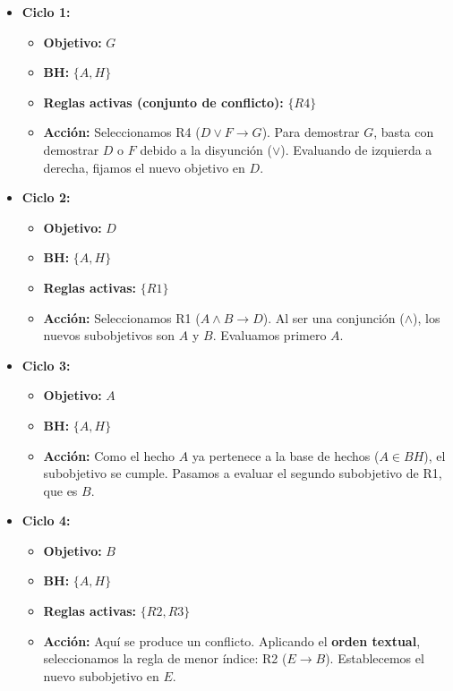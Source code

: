 \documentclass[11pt, a4paper]{article}
\newenvironment{problem}[1][Cuestión]{
	\vspace{0.5cm}
	\noindent{\Large\bfseries #1} \par\vspace{0.5cm}
}{
	\vspace{0.5cm}
}
\begin{document}
\begin{problem}[Cuestión 3 (30 \%)]
{			\begin{itemize}
				\item \textbf{Ciclo 1:}
					\begin{itemize}
						\item \textbf{Objetivo:} $G$
						\item \textbf{BH:} $\{A, H\}$
						\item \textbf{Reglas activas (conjunto de conflicto):} $\{R4\}$
						\item \textbf{Acción:} Seleccionamos R4 ($D \vee F \rightarrow G$). Para demostrar $G$, basta con demostrar $D$ o $F$ debido a la disyunción ($\vee$). Evaluando de izquierda a derecha, fijamos el nuevo objetivo en $D$.
					\end{itemize}

				\item \textbf{Ciclo 2:}
					\begin{itemize}
						\item \textbf{Objetivo:} $D$
						\item \textbf{BH:} $\{A, H\}$
						\item \textbf{Reglas activas:} $\{R1\}$
						\item \textbf{Acción:} Seleccionamos R1 ($A \wedge B \rightarrow D$). Al ser una conjunción ($\wedge$), los nuevos subobjetivos son $A$ y $B$. Evaluamos primero $A$.
					\end{itemize}

				\item \textbf{Ciclo 3:}
					\begin{itemize}
						\item \textbf{Objetivo:} $A$
						\item \textbf{BH:} $\{A, H\}$
						\item \textbf{Acción:} Como el hecho $A$ ya pertenece a la base de hechos ($A \in BH$), el subobjetivo se cumple. Pasamos a evaluar el segundo subobjetivo de R1, que es $B$.
					\end{itemize}

				\item \textbf{Ciclo 4:}
					\begin{itemize}
						\item \textbf{Objetivo:} $B$
						\item \textbf{BH:} $\{A, H\}$
						\item \textbf{Reglas activas:} $\{R2, R3\}$
						\item \textbf{Acción:} Aquí se produce un conflicto. Aplicando el \textbf{orden textual}, seleccionamos la regla de menor índice: R2 ($E \rightarrow B$). Establecemos el nuevo subobjetivo en $E$.
					\end{itemize}


\end{itemize}}
\end{problem}
\end{document}
